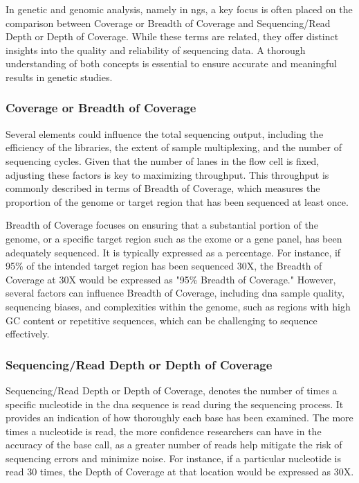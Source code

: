 In genetic and genomic analysis, namely in \ac{ngs}, a key focus is often placed on the comparison between Coverage or Breadth of Coverage and Sequencing/Read Depth or Depth of Coverage. While these terms are related, they offer distinct insights into the quality and reliability of sequencing data. A thorough understanding of both concepts is essential to ensure accurate and meaningful results in genetic studies.

\subsubsection{\textbf{Coverage or Breadth of Coverage}} \label{subsubsec:ngs_coverage}

Several elements could influence the total sequencing output, including the efficiency of the libraries, the extent of sample multiplexing, and the number of sequencing cycles. Given that the number of lanes in the flow cell is fixed, adjusting these factors is key to maximizing throughput. This throughput is commonly described in terms of Breadth of Coverage, which measures the proportion of the genome or target region that has been sequenced at least once. \cite{Larson2023}

Breadth of Coverage focuses on ensuring that a substantial portion of the genome, or a specific target region such as the exome or a gene panel, has been adequately sequenced. It is typically expressed as a percentage. For instance, if 95\% of the intended target region has been sequenced 30X, the Breadth of Coverage at 30X would be expressed as "95\% Breadth of Coverage." However, several factors can influence Breadth of Coverage, including \ac{dna} sample quality, sequencing biases, and complexities within the genome, such as regions with high GC content or repetitive sequences, which can be challenging to sequence effectively. \cite{3billion2023}

\subsubsection{\textbf{Sequencing/Read Depth or Depth of Coverage}} \label{subsubsec:ngs_ard}

Sequencing/Read Depth or Depth of Coverage, denotes the number of times a specific nucleotide in the \ac{dna} sequence is read during the sequencing process. It provides an indication of how thoroughly each base has been examined. The more times a nucleotide is read, the more confidence researchers can have in the accuracy of the base call, as a greater number of reads help mitigate the risk of sequencing errors and minimize noise. For instance, if a particular nucleotide is read 30 times, the Depth of Coverage at that location would be expressed as 30X. \cite{3billion2023}


